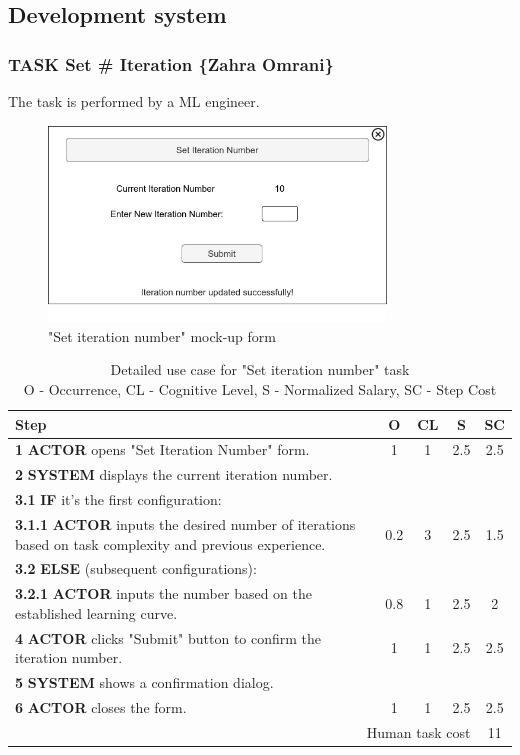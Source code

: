 \subsection{Development system}

\subsubsection{TASK Set \# Iteration \{Zahra Omrani\}}

The task is performed by a ML engineer.

\begin{figure}[H]
\centering
\includegraphics[width=0.8\textwidth]{figures/set_iteration_number.png}
\caption{"Set iteration number" mock-up form}
\end{figure}

\begin{table}[H]
\centering
\begin{tabularx}{\textwidth}{|X|c|c|c|c|}
\hline
\textbf{Step} & \textbf{O} & \textbf{CL} & \textbf{S} & \textbf{SC} \\
\hline
\textbf{1} \textbf{ACTOR} opens "Set Iteration Number" form. & 1 & 1 & 2.5 & 2.5 \\
\hline
\textbf{2} \textbf{SYSTEM} displays the current iteration number. & & & & \\
\hline
\textbf{3.1} \textbf {IF} it's the first configuration: &  &  &  & \\
\hline
\textbf{3.1.1} \textbf {ACTOR} inputs the desired number of iterations based on task complexity and previous experience. & 0.2 & 3 & 2.5 & 1.5 \\
\hline
\textbf{3.2} \textbf {ELSE} (subsequent configurations): & & & & \\
\hline
\textbf{3.2.1} \textbf{ACTOR} inputs the number based on the established learning curve. & 0.8&1 &2.5 &2 \\
\hline
\textbf{4} \textbf{ACTOR} clicks "Submit" button to confirm the iteration number. & 1 & 1 & 2.5 & 2.5 \\
\hline
\textbf{5} \textbf{SYSTEM} shows a confirmation dialog. & & & & \\
\hline
\textbf{6} \textbf{ACTOR} closes the form. & 1 & 1 & 2.5 & 2.5 \\
\hline
\multicolumn{4}{|r|}{Human task cost} & 11\\
\hline
\end{tabularx}
\caption{Detailed use case for "Set iteration number" task\\ 
O - Occurrence, CL - Cognitive Level, S - Normalized Salary, SC - Step Cost}
\label{table:set_iteration_number}
\end{table}

